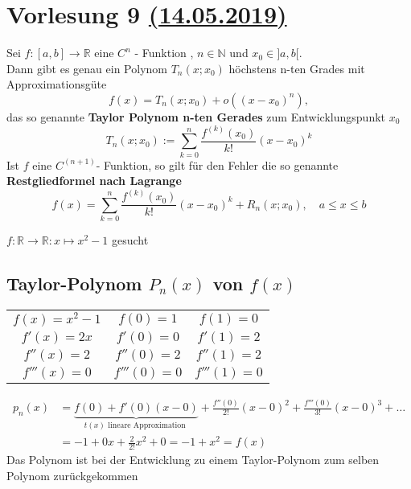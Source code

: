 \section{Vorlesung 9 \href{https://tu-dresden.de/mn/math/algebra/das-institut/beschaeftigte/antje-noack/ressourcen/dateien/v120-1/MathMethInf09.pdf?lang=en}{(14.05.2019)} }

\begin{definition}
Sei $f : [a,b] \rightarrow \mathbb{R} $ eine $C^n$ - Funktion , $ n \in \mathbb{N}$ und $x_0 \in ]a , b[$.\\
Dann gibt es genau ein Polynom $T_n(x;x_0)$ höchstens n-ten Grades mit Approximationsgüte 
 \[ f(x) = T_n(x;x_0) + o((x-x_0)^n), \]
das so genannte \textbf{Taylor Polynom n-ten Gerades} zum Entwicklungspunkt $x_0$
\[ T_n(x;x_0) := \sum_{k=0}^{n}{\dfrac{f^(k)(x_0)}{k!}(x-x_0)^k} \]
Ist $ f $ eine $C^{(n+1)}$- Funktion, so gilt für den Fehler die so genannte \textbf{Restgliedformel nach Lagrange}
\[ f(x) = \sum_{k=0}^{n}{\dfrac{f^(k)(x_0)}{k!}(x-x_0)^k} + R_n(x;x_0), \quad a \leq x \leq b \]    

\end{definition}



\begin{example}
$f: \mathbb{R} \rightarrow \mathbb{R} : x \mapsto x^2-1 $ gesucht
\end{example}
\subsection{Taylor-Polynom $P_n(x)$ von $f(x)$}
\begin{center}
\begin{tabular}{ c c c }
$f(x)= x^2-1$  & $f(0) = 1 $     & $f(1) = 0$ \\ 
$f'(x) = 2x $  & $f'(0) = 0 $    & $f'(1) = 2$ \\  
$f''(x) = 2 $  & $f''(0) = 2 $   & $f''(1) = 2$  \\
$f'''(x) = 0 $ & $f'''(0) = 0 $  & $f'''(1) = 0$  
\end{tabular}
\end{center}

\begin{align*}
p_n(x) &= \underbrace{f(0) + f'(0)(x-0)}_{t(x) \text{ lineare Approximation }}  + \frac{f''(0)}{2!}(x-0)^2 + \frac{f'''(0)}{3!}(x-0)^3 + \dots\\
&= -1 + 0 x + \frac{2}{2!} x^2 + 0 = -1 + x^2 = f(x)
\end{align*}
Das Polynom ist bei der Entwicklung zu einem Taylor-Polynom zum selben Polynom zurückgekommen

